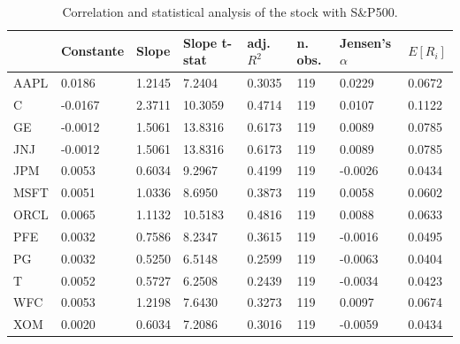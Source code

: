 \documentclass[a4paper,11pt,twoside]{article}
\begin{document}
\begin{center} %
\begin{table}[H]
\centering
\begin{tabular}{| l | lllllll | }
\hline
& Constante & Slope   & Slope t-stat & adj. $R^2$ & n. obs. & Jensen's $\alpha$ & $E[R_i]$        \\
\hline
\hline
AAPL      & 0.0186  & 1.2145       & 7.2404             & 0.3035          & 119            & 0.0229          & 0.0672 \\
C         & -0.0167 & 2.3711       & 10.3059            & 0.4714          & 119            & 0.0107          & 0.1122 \\
GE        & -0.0012 & 1.5061       & 13.8316            & 0.6173          & 119            & 0.0089          & 0.0785 \\
JNJ       & -0.0012 & 1.5061       & 13.8316            & 0.6173          & 119            & 0.0089          & 0.0785 \\
JPM       & 0.0053  & 0.6034       & 9.2967             & 0.4199          & 119            & -0.0026         & 0.0434 \\
MSFT      & 0.0051  & 1.0336       & 8.6950             & 0.3873          & 119            & 0.0058          & 0.0602 \\
ORCL      & 0.0065  & 1.1132       & 10.5183            & 0.4816          & 119            & 0.0088          & 0.0633 \\
PFE       & 0.0032  & 0.7586       & 8.2347             & 0.3615          & 119            & -0.0016         & 0.0495 \\
PG        & 0.0032  & 0.5250       & 6.5148             & 0.2599          & 119            & -0.0063         & 0.0404 \\
T         & 0.0052  & 0.5727       & 6.2508             & 0.2439          & 119            & -0.0034         & 0.0423 \\
WFC       & 0.0053  & 1.2198       & 7.6430             & 0.3273          & 119            & 0.0097          & 0.0674 \\
XOM       & 0.0020  & 0.6034       & 7.2086             & 0.3016          & 119            & -0.0059         & 0.0434 \\
\hline
\end{tabular}
\label{table_short}
\caption{Correlation and statistical analysis of the stock with S\&P500.}
\end{table}
\end{center}
\end{document}
